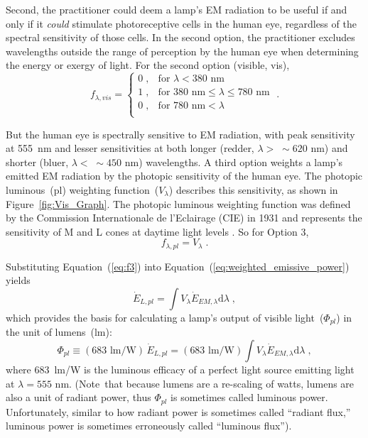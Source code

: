 \documentclass[energies,article,accept,moreauthors,pdftex]{Definitions/mdpi}\usepackage[]{graphicx}\usepackage[]{color}
\newcommand{\del}[1]{}
\newcommand{\enoex}{energy or exergy}
\providecommand{\DIFdelbegin}{} %
\providecommand{\DIFdelend}{} %
\newcommand{\DIFscaledelfig}{0.5}
\newlength{\DIFdelgraphicswidth} %
\newlength{\DIFdelgraphicsheight} %
\newcommand{\DIFdelincludegraphics}[2][]{%
\sbox{\DIFdelgraphicsbox}{\DIFOincludegraphics[#1]{#2}}%
\settoboxwidth{\DIFdelgraphicswidth}{\DIFdelgraphicsbox} %
\settoboxtotalheight{\DIFdelgraphicsheight}{\DIFdelgraphicsbox} %
\scalebox{\DIFscaledelfig}{%
\parbox[b]{\DIFdelgraphicswidth}{\usebox{\DIFdelgraphicsbox}\\[-\baselineskip] \rule{\DIFdelgraphicswidth}{0em}}\llap{\resizebox{\DIFdelgraphicswidth}{\DIFdelgraphicsheight}{%
\setlength{\unitlength}{\DIFdelgraphicswidth}%
\begin{picture}(1,1)%
\thicklines\linethickness{2pt} %
{\color[rgb]{1,0,0}\put(0,0){\framebox(1,1){}}}%
{\color[rgb]{1,0,0}\put(0,0){\line( 1,1){1}}}%
{\color[rgb]{1,0,0}\put(0,1){\line(1,-1){1}}}%
\end{picture}%
}\hspace*{3pt}}} %
} %
\DeclareRobustCommand{\DIFdelbegin}{\DIFOdelbegin \let\includegraphics\DIFdelincludegraphics} %
\DeclareRobustCommand{\DIFdelend}{\DIFOaddend \let\includegraphics\DIFOincludegraphics} %
\begin{document}
Second, the practitioner could 
deem a lamp's EM radiation to be useful if and only if it \emph{could}
stimulate photoreceptive cells in the human eye,
regardless of the spectral sensitivity of those cells.
In the second option, the practitioner excludes wavelengths outside the range of perception by the human eye
when determining the \enoex{} of light.
For the second option (visible, vis),
\begin{equation} \label{eq:f2}
f_{\lambda,vis} =
  \begin{cases}
    0 \; , & \text{for } \lambda < 380 \text{ nm} \\
    1 \; , & \text{for } 380 \text{ nm} \le \lambda \le 780 \text{ nm} \\
    0 \; , & \text{for } 780 \text{ nm} < \lambda \\
  \end{cases} \; .
\end{equation}

But the human eye is spectrally sensitive to EM radiation, 
with peak sensitivity at 555~nm 
\DIFdelbegin %
\DIFdelend and lesser sensitivities at both 
longer (redder, $\lambda > \; \sim{}620 \text{ nm}$) and
shorter (bluer, $\lambda < \; \sim{}450 \text{ nm}$) wavelengths.
A third option weights a lamp's emitted EM radiation 
by the photopic sensitivity of the human eye.
The photopic luminous~(pl) weighting function~($V_\lambda$) describes this sensitivity, 
as shown in Figure~\ref{fig:Vis_Graph}.
The photopic luminous weighting function 
was defined by the Commission Internationale de l'Eclairage (CIE) in 1931
and represents the sensitivity of M and L cones
at daytime light levels \cite{CVRL2008}.
So for Option 3,
\begin{equation} \label{eq:f3}
  f_{\lambda,pl} = V_\lambda \; .
\end{equation}

Substituting Equation~(\ref{eq:f3}) into Equation~(\ref{eq:weighted_emissive_power})
yields
\begin{equation}
  \dot{E}_{L,pl} = \int V_\lambda \dot{E}_{EM,\lambda} \mathrm{d}\lambda \; ,
\end{equation}
%
which provides the basis for calculating a lamp's output 
of visible light~($\Phi_{pl}$) in the unit of lumens~(lm):
\begin{equation} \label{eq:lumen}
  \Phi_{pl} \equiv (683 \text{ lm/W}) \, \dot{E}_{L,pl} 
                 = (683 \text{ lm/W}) \int V_\lambda \dot{E}_{EM,\lambda} \mathrm{d}\lambda \; ,
\end{equation}
%
where 683~lm/W is the luminous efficacy of a perfect light source
emitting \DIFdelbegin %
\DIFdelend light at $\lambda = 555 \text{ nm}$.
\mbox{(Note that} because lumens are a re-scaling of watts, 
lumens are also a unit of radiant power, 
thus $\Phi_{pl}$ is sometimes called luminous power. 
Unfortunately, similar to how radiant power is sometimes called ``radiant flux,'' 
luminous power is sometimes erroneously called ``luminous flux'').
\end{document}
